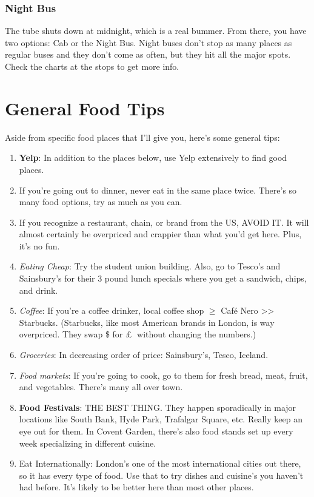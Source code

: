 \documentclass[a4paper,12pt]{scrartcl}
\begin{document}
\subsubsection{Night Bus}
The tube shuts down at midnight, which is a real bummer.
From there, you have two options: Cab or the Night Bus.
Night buses don't stop as many places as regular buses and they
don't come as often, but they hit all the major spots.
Check the charts at the stops to get more info.


\section{General Food Tips}

Aside from specific food places that I'll give you, here's some
general tips:
\begin{enumerate}
   \item \textbf{Yelp}: 
      In addition to the places below, use Yelp extensively
	     to find good places.
   \item If you're going out to dinner, never eat in the same place
       twice.  There's so many food options, try as much as you can.
   \item If you recognize a restaurant, chain, or brand from the US, 
      AVOID IT. It will almost certainly be overpriced and crappier 
      than what you'd get here. Plus, it's no fun.
   \item {\sl Eating Cheap}: 
      Try the student union building. Also, go to 
       Tesco's and Sainsbury's for their 3 pound lunch specials where
       you get a sandwich, chips, and drink.
    \item {\sl Coffee}: If you're a coffee drinker, 
      local coffee shop $\geq$ Café Nero >>
      Starbucks. (Starbucks, like most American brands in London,
      is way overpriced. They swap \$ for \pounds $\;$ without changing
      the numbers.)
   \item {\sl Groceries}: In decreasing order of price: 
      Sainsbury's, Tesco, Iceland.
   \item {\sl Food markets}: If you're going to cook, 
      go to them for fresh bread, meat, fruit, and vegetables. 
      There's many all over town.
   \item \textbf{Food Festivals}: THE BEST THING. 
      They happen sporadically in major locations like South Bank, 
      Hyde Park, Trafalgar Square, etc. Really
      keep an eye out for them. In Covent Garden, there's also
      food stands set up every week specializing in different cuisine.
   \item Eat Internationally: London's one of the most international
	  cities out there, so it has every type of food.
	  Use that to try dishes and cuisine's you haven't had
	  before. It's likely to be better here than most other places.
\end{enumerate}
\end{document}
